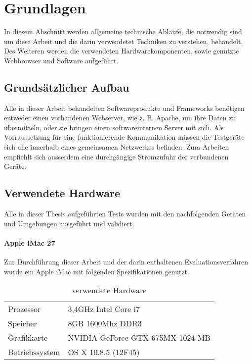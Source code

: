 \chapter{Grundlagen}
In diesem Abschnitt werden allgemeine technische Abläufe, die notwendig sind um diese Arbeit und die darin verwendetet Techniken zu verstehen, behandelt. Des Weiteren werden die verwendeten Hardwarekomponenten, sowie genutzte \Gls{Webbrowser} und Software aufgeführt.

	\section{Grundsätzlicher Aufbau}
	Alle in dieser Arbeit behandelten Softwareprodukte und \Gls{Framework}s benötigen entweder einen vorhandenen Webserver, wie z. B. \Gls{Apache}, um ihre Daten zu übermitteln, oder sie bringen einen softwareinternen Server mit sich. Als Vorraussetzung für eine funktionierende Kommunikation müssen die Testgeräte sich alle innerhalb eines gemeinsamen Netzwerkes befinden. Zum Arbeiten empfiehlt sich ausserdem eine durchgängige Stromzufuhr der verbundenen Geräte.
	
	

	

	
	\pagebreak
	\section{Verwendete Hardware}
	Alle in dieser Thesis aufgeführten Tests wurden mit den nachfolgenden Geräten und Umgebungen ausgeführt und validiert.
	
	\subsubsection{Apple iMac 27\texttt\dq}
	Zur Durchführung dieser Arbeit und der darin enthaltenen Evaluationsverfahren wurde ein Apple iMac mit folgenden 				Spezifikationen genutzt.
	
	\begin{table}[H]
	 \vspace{-20pt}
 		\centering
			\begin{tabular}{| p{4cm} | p{8cm}  |}
			\hline
				Prozessor			&	3,4GHz Intel Core i7 \\
				Speicher			&	8GB 1600Mhz DDR3\\
				Grafikkarte		&	NVIDIA GeForce GTX 675MX 1024 MB\\
				Betriebssystem		&	OS X 10.8.5 (12F45)\\

				\hline
				\end{tabular}
			\caption{verwendete Hardware}
	\end{table}

